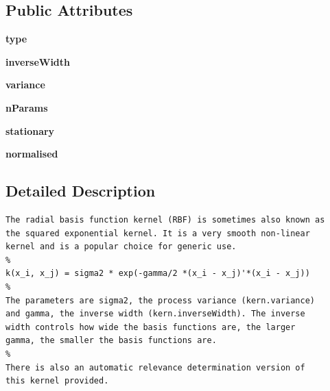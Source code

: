 \subsection*{Public Attributes}
\begin{CompactItemize}
\item 
\hypertarget{classkerndox_1_1rbf_93974cc6c6fd731226b7c08aefbc9535}{
\textbf{type}}
\label{classkerndox_1_1rbf_93974cc6c6fd731226b7c08aefbc9535}

\item 
\hypertarget{classkerndox_1_1rbf_f5afeb1b2bde9987fdfbc5f1d0feea5c}{
\textbf{inverseWidth}}
\label{classkerndox_1_1rbf_f5afeb1b2bde9987fdfbc5f1d0feea5c}

\item 
\hypertarget{classkerndox_1_1rbf_f1c9cf8859b45fc4e0c79de0b7bcd273}{
\textbf{variance}}
\label{classkerndox_1_1rbf_f1c9cf8859b45fc4e0c79de0b7bcd273}

\item 
\hypertarget{classkerndox_1_1rbf_09bc0ec13a8c7ecccbb49e37aa92537d}{
\textbf{nParams}}
\label{classkerndox_1_1rbf_09bc0ec13a8c7ecccbb49e37aa92537d}

\item 
\hypertarget{classkerndox_1_1rbf_08289a7c641d13fdabc7463d39b0992d}{
\textbf{stationary}}
\label{classkerndox_1_1rbf_08289a7c641d13fdabc7463d39b0992d}

\item 
\hypertarget{classkerndox_1_1rbf_05ff5e0809d631804cd2f73b95694a78}{
\textbf{normalised}}
\label{classkerndox_1_1rbf_05ff5e0809d631804cd2f73b95694a78}

\end{CompactItemize}


\subsection{Detailed Description}


\footnotesize\begin{verbatim}The radial basis function kernel (RBF) is sometimes also known as
the squared exponential kernel. It is a very smooth non-linear
kernel and is a popular choice for generic use.
%
k(x_i, x_j) = sigma2 * exp(-gamma/2 *(x_i - x_j)'*(x_i - x_j))
%
The parameters are sigma2, the process variance (kern.variance)
and gamma, the inverse width (kern.inverseWidth). The inverse
width controls how wide the basis functions are, the larger
gamma, the smaller the basis functions are.
%
There is also an automatic relevance determination version of
this kernel provided.

\end{verbatim}
\normalsize
 

